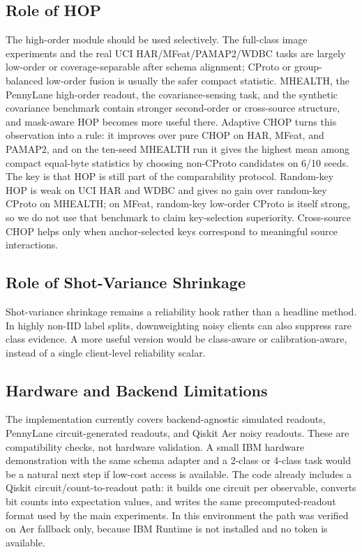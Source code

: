 \subsection{Role of HOP}

The high-order module should be used selectively. The full-class image experiments and the real UCI HAR/MFeat/PAMAP2/WDBC tasks are largely low-order or coverage-separable after schema alignment; CProto or group-balanced low-order fusion is usually the safer compact statistic. MHEALTH, the PennyLane high-order readout, the covariance-sensing task, and the synthetic covariance benchmark contain stronger second-order or cross-source structure, and mask-aware HOP becomes more useful there. Adaptive CHOP turns this observation into a rule: it improves over pure CHOP on HAR, MFeat, and PAMAP2, and on the ten-seed MHEALTH run it gives the highest mean among compact equal-byte statistics by choosing non-CProto candidates on 6/10 seeds. The key is that HOP is still part of the comparability protocol. Random-key HOP is weak on UCI HAR and WDBC and gives no gain over random-key CProto on MHEALTH; on MFeat, random-key low-order CProto is itself strong, so we do not use that benchmark to claim key-selection superiority. Cross-source CHOP helps only when anchor-selected keys correspond to meaningful source interactions.

\subsection{Role of Shot-Variance Shrinkage}

Shot-variance shrinkage remains a reliability hook rather than a headline method. In highly non-IID label splits, downweighting noisy clients can also suppress rare class evidence. A more useful version would be class-aware or calibration-aware, instead of a single client-level reliability scalar.

\subsection{Hardware and Backend Limitations}

The implementation currently covers backend-agnostic simulated readouts, PennyLane circuit-generated readouts, and Qiskit Aer noisy readouts. These are compatibility checks, not hardware validation. A small IBM hardware demonstration with the same schema adapter and a 2-class or 4-class task would be a natural next step if low-cost access is available. The code already includes a Qiskit circuit/count-to-readout path: it builds one circuit per observable, converts bit counts into expectation values, and writes the same precomputed-readout format used by the main experiments. In this environment the path was verified on Aer fallback only, because IBM Runtime is not installed and no token is available.

